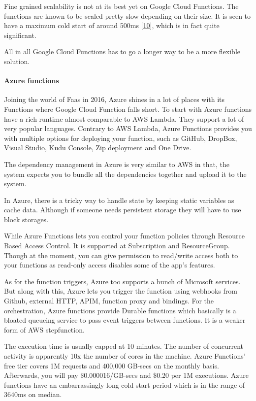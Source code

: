 \documentclass[12pt,titlepage]{article}
\begin{document}
Fine grained scalability is not at its best yet on Google Cloud Functions. The
functions are known to be scaled pretty slow depending on their size. It is seen
to have a maximum cold start of around 500ms \hyperref[ref:10]{[10}], which is in fact
quite significant.

All in all Google Cloud Functions has to go a longer way to be a more flexible solution.

\paragraph{Azure functions}
\label{sec:org38b45f3}
Joining the world of Faas in 2016, Azure shines in a lot of places with its
Functions where Google Cloud Function falls short. To start with Azure functions
have a rich runtime almost comparable to AWS Lambda. They support a lot of very
popular languages. Contrary to AWS Lambda, Azure Functions provides you with
multiple options for deploying your function, such as GitHub, DropBox, Visual
Studio, Kudu Console, Zip deployment and One Drive.

The dependency management in Azure is very similar to AWS in that, the system
expects you to bundle all the dependencies together and upload it to the system.

In Azure, there is a tricky way to handle state by keeping static variables as
cache data. Although if someone needs persistent storage they will have to use
block storages.

While Azure Functions lets you control your function policies through Resource
Based Access Control. It is supported at Subscription and ResourceGroup. Though
at the moment, you can give permission to read/write access both to your
functions as read-only access disables some of the app’s features.

As for the function triggers, Azure too supports a bunch of Microsoft services.
But along with this, Azure lets you trigger the function using webhooks from
Github, external HTTP, APIM, function proxy and bindings. For the orchestration,
Azure functions provide Durable functions which basically is a bloated queueing
service to pass event triggers between functions. It is a weaker form of AWS
stepfunction.

The execution time is usually capped at 10 minutes. The number of concurrent
activity is apparently 10x the number of cores in the machine. Azure Functions’
free tier covers 1M requests and 400,000 GB-secs on the monthly basis.
Afterwards, you will pay \$0.000016/GB-secs and \$0.20 per 1M executions. Azure
functions have an embarrassingly long cold start period which is in the range of
3640ms on median.
\end{document}
